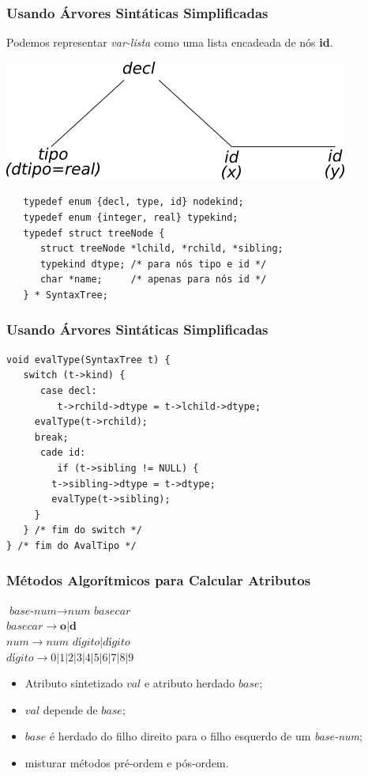 \documentclass[table]{beamer}
\begin{document}
\begin{frame}[fragile]
   \frametitle{Usando Árvores Sintáticas Simplificadas}
   Podemos representar \textit{var-lista} como uma lista encadeada de nós \textbf{id}. \\
   \begin{center}
   \includegraphics[scale=0.5]{figuras/exemplo610simplificado.png}
   \end{center}
   \begin{verbatim}
   typedef enum {decl, type, id} nodekind;
   typedef enum {integer, real} typekind;
   typedef struct treeNode {
      struct treeNode *lchild, *rchild, *sibling;
      typekind dtype; /* para nós tipo e id */
      char *name;     /* apenas para nós id */
   } * SyntaxTree;
   \end{verbatim}
\end{frame}

\begin{frame}[fragile]
   \frametitle{Usando Árvores Sintáticas Simplificadas}
   \begin{verbatim}
void evalType(SyntaxTree t) {
   switch (t->kind) {
      case decl:
         t->rchild->dtype = t->lchild->dtype;
	 evalType(t->rchild);
	 break;
      cade id:
         if (t->sibling != NULL) {
	    t->sibling->dtype = t->dtype;
	    evalType(t->sibling);
	 }
   } /* fim do switch */ 
} /* fim do AvalTipo */
   \end{verbatim}
\end{frame}

\begin{frame}
   \frametitle{Métodos Algorítmicos para Calcular Atributos}
   $\textit{base-num}\to\textit{num basecar}$ \\
   $basecar\to\textbf{o}|\textbf{d}$ \\
   $num\to\textit{num dígito}|\textit{dígito}$ \\ 
   $\textit{dígito}\to0|1|2|3|4|5|6|7|8|9$ \\
   \begin{itemize}
      \item Atributo sintetizado $val$ e atributo herdado $base$;
      \item $val$ depende de $base$;
      \item $base$ é herdado do filho direito para o filho esquerdo de um \textit{base-num};
      \item misturar métodos pré-ordem e pós-ordem.
   \end{itemize}
\end{frame}
\end{document}
